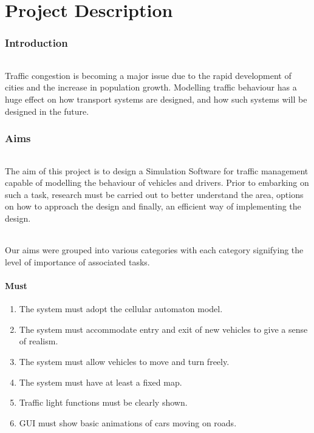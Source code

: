\documentclass[11pt, a4]{article}
\begin{document}
\part*{Project Description}
\section{Introduction} \label{introduction}
\paragraph{}
Traffic congestion is becoming a major issue due to the rapid development of cities and the increase in population growth. Modelling traffic behaviour has a huge effect on how  transport systems are designed, and how such systems will be designed in the future.

\section{Aims} \label{aims}
\paragraph{}
The aim of this project is to design a Simulation Software for traffic management capable of modelling the behaviour of vehicles and drivers.
Prior to embarking on such a task, research must be carried out to better understand the area, options on how to approach the design and finally, an efficient way of implementing the design.  

\paragraph{}
Our aims were grouped into various categories with each category signifying the level of importance of associated tasks. 

\subsection{Must} \label{sub:must}
\begin{enumerate}[itemsep = -1ex]
\item The system must adopt the cellular automaton model.
\item The system must accommodate entry and exit of new vehicles to give a sense of realism.
\item The system must allow vehicles to move and turn freely.
\item The system must have at least a fixed map.
\item Traffic light functions must be clearly shown.
\item GUI must show basic animations of cars moving on roads.
\end{enumerate}
\end{document}

